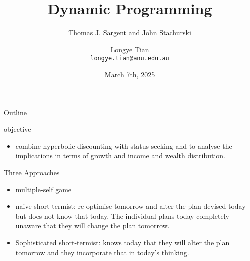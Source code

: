 \documentclass[aspectratio=169]{beamer} %
\title[DP2]{Dynamic Programming}
\subtitle{Thomas J. Sargent and John Stachurski}
\author[Longye]{Longye Tian \\ \texttt{longye.tian@anu.edu.au}}
\institute[ANU]{Australian National University\\ School of Economics}
\date{March 7th, 2025}
\begin{document}
\begin{frame}
  \titlepage
\end{frame}

\begin{frame}{Outline}
  \tableofcontents
\end{frame}

\begin{frame}{objective}
\begin{itemize}
    \item combine hyperbolic discounting with status-seeking and to analyse the implications in terms of growth and income and wealth distribution. 
\end{itemize}
    
\end{frame}

\begin{frame}{Three Approaches}
\begin{itemize}
    \item multiple-self game
    \item naive short-termist: re-optimise tomorrow and alter the plan devised today but does not know that today. The individual plans today completely unaware that they will change the plan tomorrow.
    \item Sophisticated short-termist: knows today that they will alter the plan tomorrow and they incorporate that in today's thinking. 
\end{itemize}    
\end{frame}
\end{document}
